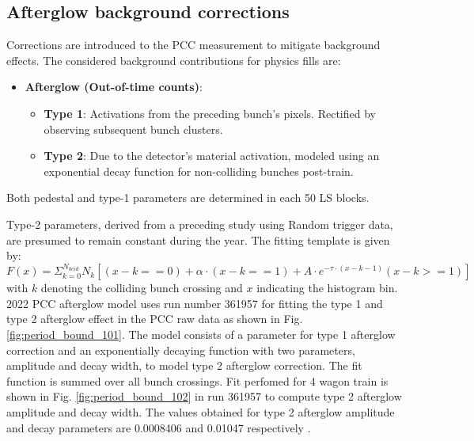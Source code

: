 \subsection{Afterglow background corrections}


Corrections are introduced to the PCC measurement to mitigate background effects. The considered background contributions for physics fills are:

\begin{itemize}
    
    \item \textbf{Afterglow (Out-of-time counts)}:
    \begin{itemize}
        \item \textbf{Type 1}: Activations from the preceding bunch's pixels. Rectified by observing subsequent bunch clusters.
        
        \item \textbf{Type 2}: Due to the detector's material activation, modeled using an exponential decay function for non-colliding bunches post-train.
    \end{itemize}
\end{itemize}

Both pedestal and type-1 parameters are determined in each 50 LS blocks.

Type-2 parameters, derived from a preceding study using Random trigger data, are presumed to remain constant during the year. The fitting template is given by:
\begin{equation}
F(x) = \Sigma_{k=0}^{N_{bcid}} N_k \left[(x-k==0)+\alpha\cdot(x-k==1)+A \cdot e^{-\tau\cdot(x-k-1)}(x-k>=1) \right]
\end{equation}
with $k$ denoting the colliding bunch crossing and $x$ indicating the histogram bin. 2022 PCC afterglow model uses run number 361957 for fitting the type 1 and type 2 afterglow effect in the PCC raw data as shown in Fig. \ref{fig:period_bound_101}. The model consists of a parameter for type 1 afterglow correction and an exponentially decaying function with two parameters, amplitude and decay width, to model type 2 afterglow correction. The fit function
is summed over all bunch crossings. Fit perfomed for 4 wagon train is shown in Fig.  \ref{fig:period_bound_102} in run 361957 to compute type 2 afterglow amplitude and decay width. The values obtained for type 2 afterglow amplitude and decay parameters are 0.0008406 and 0.01047 respectively \cite{pas_22}. %

